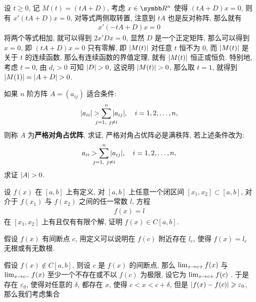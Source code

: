 \begin{exercise}[series=exer]
\begin{hint}
    \end{hint}
    \begin{answer}
        设 $ t \ge 0 $, 记 $ M(t) = (tA + D) $, 考虑 $ x \in \R^{n} $ 使得 $ (tA + D)x = 0 $, 则有 $ x'(tA + D)x = 0 $, 对等式两侧取转置, 注意到 $ tA $ 也是反对称阵, 那么就有
        \begin{align*}
            x'(-tA + D)x = 0
        \end{align*}
        将两个等式相加, 就可以得到 $ 2x'Dx = 0 $, 显然 $ D $ 是一个正定矩阵, 那么可以得到 $ x = 0 $, 即 $ (tA + D)x = 0 $ 只有零解, 即 $ \abs{M(t)} $ 对任意 $ t $ 恒不为 $ 0 $, 而 $ \abs{M(t)} $ 是关于 $ t $ 的连续函数, 那么有连续函数的界值定理, 就有 $ \abs{M(t)} $ 恒正或恒负. 特别地, 考虑 $ t = 0 $, 由 $ d_{i} > 0 $ 可知 $ \abs{D} > 0 $, 这说明 $ \abs{M(t)} > 0 $, 那么取 $ t = 1 $, 就得到 $ \abs{M(1)} = \abs{A + D} > 0 $. 
    \end{answer}
    \item 如果 $ n $ 阶方阵 $ A = (a_{ij}) $ 适合条件:
    \begin{align*}
        \abs{a_{ii}} > \sum_{\mathclap{j = 1,\ j \ne i}}^{n} \abs{a_{ij}}, \quad i = 1, 2, \dots, n,
    \end{align*}
    则称 $ A $ 为\textbf{严格对角占优阵}, 求证, 严格对角占优阵必是满秩阵, 若上述条件改为:
    \begin{align*}
        a_{ii} > \sum_{\mathclap{j = 1,\ j \ne i}}^{n} \abs{a_{ij}}, \quad i = 1, 2, \dots, n,
    \end{align*}   
    求证 $ \abs{A} > 0 $. 
    \item 设 $ f(x) $ 在 $ [a, b] $ 上有定义, 对 $ [a, b] $ 上任意一个闭区间 $ [x_{1}, x_{2}] \subset [a, b] $, 对介于 $ f(x_{1}) $ 与 $ f(x_{2}) $ 之间的任一常数 $ l $, 方程 
    \begin{align*}
        f(x) = l
    \end{align*}
    在 $ [x_{1}, x_{2}] $ 上有且仅有有限个解, 证明 $ f(x) \in C[a, b] $.
    \begin{hint}
        假设 $ f(x) $ 有间断点 $ c $, 用定义可以说明在 $ f(c) $ 附近存在 $ l_{c} $, 使得 $ f(x) = l_{c} $ 无根或有无数根.
    \end{hint}
    \begin{answer}
        假设 $ f(x) \notin C[a, b] $, 则设 $ c $ 是 $ f(x) $ 的间断点, 那么 $ \lim_{x \to c+}f(x) $ 与 $ \lim_{x \to c-} f(x) $ 至少一个不存在或不以 $ f(c) $ 为极限, 设它为 $ \lim_{x \to c+}f(c) $ . 于是存在 $ \varepsilon_{0} $, 使得对任意的 $ \delta $, 都存在 $ x $, 使得 $ c < x < c + \delta $, 但是 $ \abs{f(x) - f(c)} \geqslant \varepsilon_{0} $, 那么我们考虑集合

\end{answer}
\end{exercise}
